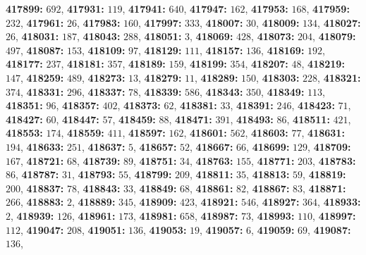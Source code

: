 \textsf{\bfseries 417899:} $692$, \textsf{\bfseries 417931:} $119$, \textsf{\bfseries 417941:} $640$, \textsf{\bfseries 417947:} $162$, \textsf{\bfseries 417953:} $168$, \textsf{\bfseries 417959:} $232$, \textsf{\bfseries 417961:} $26$, \textsf{\bfseries 417983:} $160$, \textsf{\bfseries 417997:} $333$, \textsf{\bfseries 418007:} $30$, \textsf{\bfseries 418009:} $134$, \textsf{\bfseries 418027:} $26$, \textsf{\bfseries 418031:} $187$, \textsf{\bfseries 418043:} $288$, \textsf{\bfseries 418051:} $3$, \textsf{\bfseries 418069:} $428$, \textsf{\bfseries 418073:} $204$, \textsf{\bfseries 418079:} $497$, \textsf{\bfseries 418087:} $153$, \textsf{\bfseries 418109:} $97$, \textsf{\bfseries 418129:} $111$, \textsf{\bfseries 418157:} $136$, \textsf{\bfseries 418169:} $192$, \textsf{\bfseries 418177:} $237$, \textsf{\bfseries 418181:} $357$, \textsf{\bfseries 418189:} $159$, \textsf{\bfseries 418199:} $354$, \textsf{\bfseries 418207:} $48$, \textsf{\bfseries 418219:} $147$, \textsf{\bfseries 418259:} $489$, \textsf{\bfseries 418273:} $13$, \textsf{\bfseries 418279:} $11$, \textsf{\bfseries 418289:} $150$, \textsf{\bfseries 418303:} $228$, \textsf{\bfseries 418321:} $374$, \textsf{\bfseries 418331:} $296$, \textsf{\bfseries 418337:} $78$, \textsf{\bfseries 418339:} $586$, \textsf{\bfseries 418343:} $350$, \textsf{\bfseries 418349:} $113$, \textsf{\bfseries 418351:} $96$, \textsf{\bfseries 418357:} $402$, \textsf{\bfseries 418373:} $62$, \textsf{\bfseries 418381:} $33$, \textsf{\bfseries 418391:} $246$, \textsf{\bfseries 418423:} $71$, \textsf{\bfseries 418427:} $60$, \textsf{\bfseries 418447:} $57$, \textsf{\bfseries 418459:} $88$, \textsf{\bfseries 418471:} $391$, \textsf{\bfseries 418493:} $86$, \textsf{\bfseries 418511:} $421$, \textsf{\bfseries 418553:} $174$, \textsf{\bfseries 418559:} $411$, \textsf{\bfseries 418597:} $162$, \textsf{\bfseries 418601:} $562$, \textsf{\bfseries 418603:} $77$, \textsf{\bfseries 418631:} $194$, \textsf{\bfseries 418633:} $251$, \textsf{\bfseries 418637:} $5$, \textsf{\bfseries 418657:} $52$, \textsf{\bfseries 418667:} $66$, \textsf{\bfseries 418699:} $129$, \textsf{\bfseries 418709:} $167$, \textsf{\bfseries 418721:} $68$, \textsf{\bfseries 418739:} $89$, \textsf{\bfseries 418751:} $34$, \textsf{\bfseries 418763:} $155$, \textsf{\bfseries 418771:} $203$, \textsf{\bfseries 418783:} $86$, \textsf{\bfseries 418787:} $31$, \textsf{\bfseries 418793:} $55$, \textsf{\bfseries 418799:} $209$, \textsf{\bfseries 418811:} $35$, \textsf{\bfseries 418813:} $59$, \textsf{\bfseries 418819:} $200$, \textsf{\bfseries 418837:} $78$, \textsf{\bfseries 418843:} $33$, \textsf{\bfseries 418849:} $68$, \textsf{\bfseries 418861:} $82$, \textsf{\bfseries 418867:} $83$, \textsf{\bfseries 418871:} $266$, \textsf{\bfseries 418883:} $2$, \textsf{\bfseries 418889:} $345$, \textsf{\bfseries 418909:} $423$, \textsf{\bfseries 418921:} $546$, \textsf{\bfseries 418927:} $364$, \textsf{\bfseries 418933:} $2$, \textsf{\bfseries 418939:} $126$, \textsf{\bfseries 418961:} $173$, \textsf{\bfseries 418981:} $658$, \textsf{\bfseries 418987:} $73$, \textsf{\bfseries 418993:} $110$, \textsf{\bfseries 418997:} $112$, \textsf{\bfseries 419047:} $208$, \textsf{\bfseries 419051:} $136$, \textsf{\bfseries 419053:} $19$, \textsf{\bfseries 419057:} $6$, \textsf{\bfseries 419059:} $69$, \textsf{\bfseries 419087:} $136$, 
